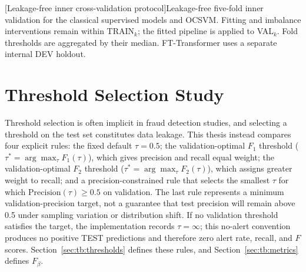 \begin{minipage}{\linewidth}
[Leakage-free inner cross-validation protocol]{Leakage-free five-fold inner validation for the classical supervised models and OCSVM. Fitting and imbalance interventions remain within TRAIN$_k$; the fitted pipeline is applied to VAL$_k$. Fold thresholds are aggregated by their median. FT-Transformer uses a separate internal DEV holdout.}
\label{fig:cv_protocol}
\end{minipage}\par\medskip

\clearpage
\flushbottom

\section{Threshold Selection Study}
\label{sec:threshold_study}

Threshold selection is often implicit in fraud detection studies, and selecting a threshold on the test set constitutes data leakage. This thesis instead compares four explicit rules: the fixed default $\tau{=}0.5$; the validation-optimal $F_1$ threshold ($\tau^{*}=\arg\max_{\tau} F_1(\tau)$), which gives precision and recall equal weight; the validation-optimal $F_2$ threshold ($\tau^{*}=\arg\max_{\tau} F_2(\tau)$), which assigns greater weight to recall; and a precision-constrained rule that selects the smallest $\tau$ for which $\text{Precision}(\tau) \geq 0.5$ on validation. The last rule represents a minimum validation-precision target, not a guarantee that test precision will remain above 0.5 under sampling variation or distribution shift. If no validation threshold satisfies the target, the implementation records $\tau=\infty$; this no-alert convention produces no positive TEST predictions and therefore zero alert rate, recall, and $F$ scores. Section~\ref{sec:tb:thresholds} defines these rules, and Section~\ref{sec:tb:metrics} defines $F_{\beta}$.

